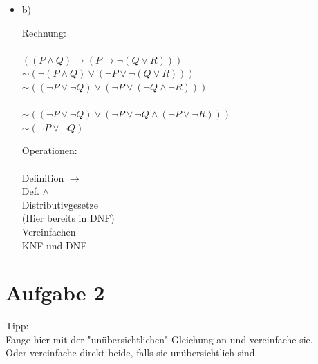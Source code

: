\documentclass[a4paper]{scrartcl}
\begin{document}
\begin{itemize}
    \item b)\\
        \begin{minipage}[t]{0.55\textwidth}
            Rechnung:\\
            \\
            $((P \land Q) \rightarrow (P \rightarrow \neg (Q \lor R)))$\\
            $\sim (\neg (P \land Q) \lor (\neg P \lor \neg (Q \lor R)))$\\
            $\sim ((\neg P \lor \neg Q) \lor (\neg P \lor (\neg Q \land \neg R)))$\\
            \\
            $\sim ((\neg P \lor \neg Q) \lor (\neg P \lor \neg Q \land (\neg P \lor \neg R)))$\\
            $\sim (\neg P \lor \neg Q)$\\
        \end{minipage}
        \begin{minipage}[t]{0.4\textwidth}
            Operationen:\\
            \\
            Definition $\rightarrow$\\
            Def. $\land$\\
            Distributivgesetze\\
            (Hier bereits in DNF)\\
            Vereinfachen\\
            KNF und DNF
        \end{minipage}
\end{itemize}

\section*{Aufgabe 2}%
\label{sec:aufgabe_2}

Tipp:\\
Fange hier mit der "unübersichtlichen" Gleichung an und vereinfache sie.\\
Oder vereinfache direkt beide, falls sie unübersichtlich sind.
\end{document}
